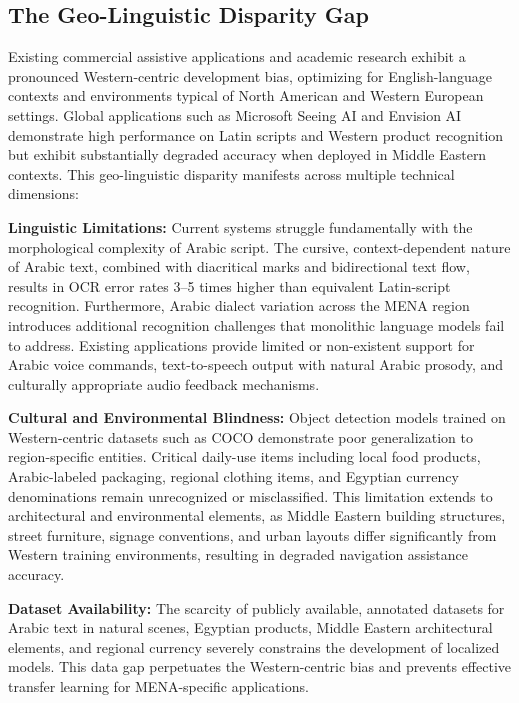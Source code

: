 \documentclass[a4paper]{report}
\begin{document}
\subsection{The Geo-Linguistic Disparity Gap}
\label{subsec:geo-linguistic-gap}

Existing commercial assistive applications and academic research exhibit a pronounced Western-centric development bias, optimizing for English-language contexts and environments typical of North American and Western European settings. Global applications such as Microsoft Seeing AI \cite{microsoft_seeingai} and Envision AI \cite{envision_ai} demonstrate high performance on Latin scripts and Western product recognition but exhibit substantially degraded accuracy when deployed in Middle Eastern contexts. This geo-linguistic disparity manifests across multiple technical dimensions:

\textbf{Linguistic Limitations:} Current systems struggle fundamentally with the morphological complexity of Arabic script. The cursive, context-dependent nature of Arabic text, combined with diacritical marks and bidirectional text flow, results in OCR error rates 3--5 times higher than equivalent Latin-script recognition. Furthermore, Arabic dialect variation across the MENA region introduces additional recognition challenges that monolithic language models fail to address. Existing applications provide limited or non-existent support for Arabic voice commands, text-to-speech output with natural Arabic prosody, and culturally appropriate audio feedback mechanisms.

\textbf{Cultural and Environmental Blindness:} Object detection models trained on Western-centric datasets such as COCO \cite{lin2014coco} demonstrate poor generalization to region-specific entities. Critical daily-use items including local food products, Arabic-labeled packaging, regional clothing items, and Egyptian currency denominations remain unrecognized or misclassified. This limitation extends to architectural and environmental elements, as Middle Eastern building structures, street furniture, signage conventions, and urban layouts differ significantly from Western training environments, resulting in degraded navigation assistance accuracy.

\textbf{Dataset Availability:} The scarcity of publicly available, annotated datasets for Arabic text in natural scenes, Egyptian products, Middle Eastern architectural elements, and regional currency severely constrains the development of localized models. This data gap perpetuates the Western-centric bias and prevents effective transfer learning for MENA-specific applications.
\end{document}
